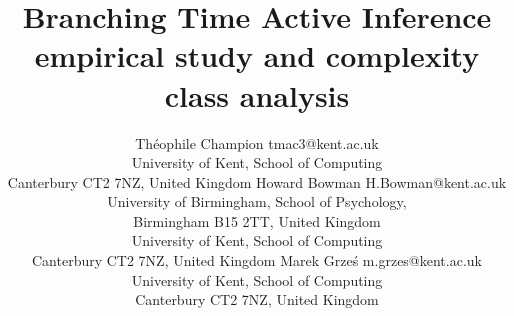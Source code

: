 \documentclass[twoside,11pt]{article}
\begin{document}
\title{Branching Time Active Inference\\
{\small empirical study and complexity class analysis}}

\author{\name Théophile Champion \email tmac3@kent.ac.uk \\
       \addr University of Kent, School of Computing\\
       Canterbury CT2 7NZ, United Kingdom
       \AND
       \name Howard Bowman \email H.Bowman@kent.ac.uk \\
       \addr University of Birmingham, School of Psychology,\\
       Birmingham B15 2TT, United Kingdom\\
       University of Kent, School of Computing\\
       Canterbury CT2 7NZ, United Kingdom
       \AND
       \name Marek Grze\'s \email m.grzes@kent.ac.uk \\
       \addr University of Kent, School of Computing\\
       Canterbury CT2 7NZ, United Kingdom
       }
       
\editor{} %

\maketitle
\end{document}
